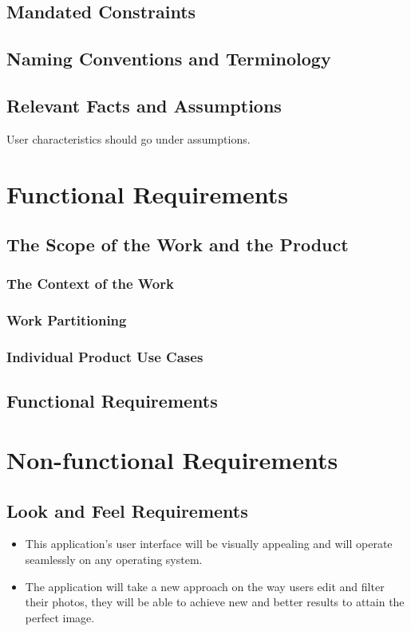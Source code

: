 \documentclass[12pt, titlepage]{article}
\begin{document}
\subsection{Mandated Constraints}

\subsection{Naming Conventions and Terminology}

\subsection{Relevant Facts and Assumptions}

User characteristics should go under assumptions.

\section{Functional Requirements}

\subsection{The Scope of the Work and the Product}

\subsubsection{The Context of the Work}

\subsubsection{Work Partitioning}

\subsubsection{Individual Product Use Cases}

\subsection{Functional Requirements}

\section{Non-functional Requirements}

\subsection{Look and Feel Requirements}
\begin{itemize}
\item This application’s user interface will be visually appealing and will operate seamlessly on any operating system.
\item The application will take a new approach on the way users edit and filter their photos, they will be able to achieve new and better results to attain the perfect image. 
\end{itemize}
\end{document}
